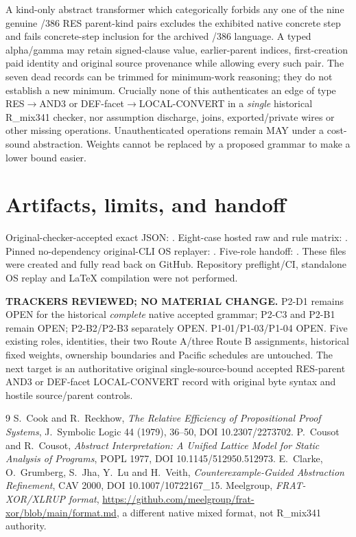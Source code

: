 \documentclass[11pt]{article}
\begin{document}
A kind-only abstract transformer which categorically forbids any one of the nine genuine /386 RES parent-kind pairs excludes the exhibited native concrete step and fails concrete-step inclusion for the archived /386 language. A typed alpha/gamma may retain signed-clause value, earlier-parent indices, first-creation paid identity and original source provenance while allowing every such pair. The seven dead records can be trimmed for minimum-work reasoning; they do not establish a new minimum. Crucially none of this authenticates an edge of type RES$\rightarrow$AND3 or DEF-facet$\rightarrow$LOCAL-CONVERT in a \emph{single} historical R\_mix341 checker, nor assumption discharge, joins, exported/private wires or other missing operations. Unauthenticated operations remain MAY under a cost-sound abstraction. Weights cannot be replaced by a proposed grammar to make a lower bound easier.

\section*{Artifacts, limits, and handoff}
Original-checker-accepted exact JSON:
.
Eight-case hosted raw and rule matrix:
.
Pinned no-dependency original-CLI OS replayer:
.
Five-role handoff:
.
These files were created and fully read back on GitHub. Repository preflight/CI, standalone OS replay and LaTeX compilation were not performed.

\noindent\textbf{TRACKERS REVIEWED; NO MATERIAL CHANGE.} P2-D1 remains OPEN for the historical \emph{complete} native accepted grammar; P2-C3 and P2-B1 remain OPEN; P2-B2/P2-B3 separately OPEN. P1-01/P1-03/P1-04 OPEN. Five existing roles, identities, their two Route A/three Route B assignments, historical fixed weights, ownership boundaries and Pacific schedules are untouched. The next target is an authoritative original single-source-bound accepted RES-parent AND3 or DEF-facet LOCAL-CONVERT record with original byte syntax and hostile source/parent controls.

\begin{thebibliography}{9}
 S.~Cook and R.~Reckhow, \emph{The Relative Efficiency of Propositional Proof Systems}, J.\ Symbolic Logic 44 (1979), 36--50, DOI 10.2307/2273702.
 P.~Cousot and R.~Cousot, \emph{Abstract Interpretation: A Unified Lattice Model for Static Analysis of Programs}, POPL 1977, DOI 10.1145/512950.512973.
 E.~Clarke, O.~Grumberg, S.~Jha, Y.~Lu and H.~Veith, \emph{Counterexample-Guided Abstraction Refinement}, CAV 2000, DOI 10.1007/10722167\_15.
 Meelgroup, \emph{FRAT-XOR/XLRUP format}, \url{https://github.com/meelgroup/frat-xor/blob/main/format.md}, a different native mixed format, not R\_mix341 authority.
\end{thebibliography}
\end{document}
